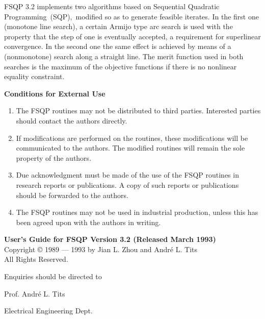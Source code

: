 \begin{titlepage}
\hspace{4mm} FSQP 3.2 implements two algorithms based on Sequential
Quadratic Programming~(SQP),~modified so as to generate
feasible iterates. In the first one (monotone line search), a certain 
Armijo type arc search is used with the property that the step of one
is eventually accepted, a requirement for superlinear convergence.
In the second one the same effect is achieved by means 
of a (nonmonotone) search along a straight line. The merit function
used in both searches is the maximum of the objective functions if
there is no nonlinear equality constraint.
\end{titlepage}

\begin{titlepage}
\centerline{\bf Conditions for External Use}
\bigskip
\begin{enumerate}
\item The FSQP routines may not be distributed to third parties. 
      Interested parties should contact the authors directly.
\item If modifications are performed on the routines, these
      modifications will be communicated to the authors. 
      The modified routines will remain
      the sole property of the authors.
\item Due acknowledgment must be made of the use of the FSQP routines in
      research reports or publications. A copy of such reports or 
      publications should be forwarded to the authors.
\item The FSQP routines may not be used in industrial production,
      unless this has been agreed upon with the authors in writing.
\end{enumerate}

\bigskip\noindent
{\bf User's Guide for FSQP Version 3.2 (Released March 1993)} \\
Copyright {\copyright} 1989 --- 1993 by Jian L. Zhou and Andr\'e L. Tits\\
All Rights Reserved.

\bigskip
\bigskip
\noindent Enquiries should be directed to 

\bigskip
\hspace{5em}Prof. Andr\'e L. Tits

\hspace{5em}Electrical Engineering Dept.


\end{titlepage}
